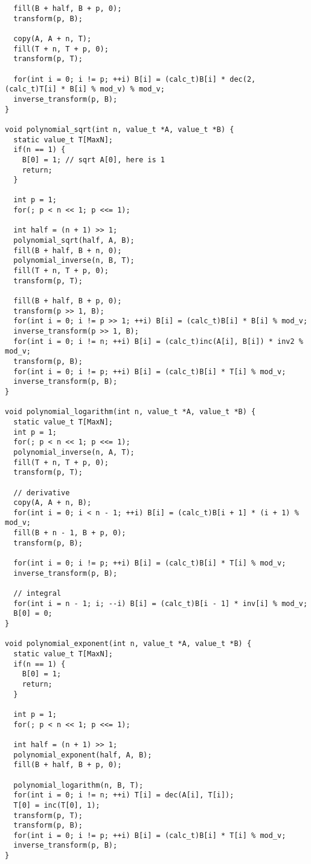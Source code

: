 \begin{verbatim}
  fill(B + half, B + p, 0);
  transform(p, B);

  copy(A, A + n, T);
  fill(T + n, T + p, 0);
  transform(p, T);

  for(int i = 0; i != p; ++i) B[i] = (calc_t)B[i] * dec(2, (calc_t)T[i] * B[i] % mod_v) % mod_v;
  inverse_transform(p, B);
}

void polynomial_sqrt(int n, value_t *A, value_t *B) {
  static value_t T[MaxN];
  if(n == 1) {
    B[0] = 1; // sqrt A[0], here is 1
    return;
  }

  int p = 1;
  for(; p < n << 1; p <<= 1);

  int half = (n + 1) >> 1;
  polynomial_sqrt(half, A, B);
  fill(B + half, B + n, 0);
  polynomial_inverse(n, B, T);
  fill(T + n, T + p, 0);
  transform(p, T);

  fill(B + half, B + p, 0);
  transform(p >> 1, B);
  for(int i = 0; i != p >> 1; ++i) B[i] = (calc_t)B[i] * B[i] % mod_v;
  inverse_transform(p >> 1, B);
  for(int i = 0; i != n; ++i) B[i] = (calc_t)inc(A[i], B[i]) * inv2 % mod_v;
  transform(p, B);
  for(int i = 0; i != p; ++i) B[i] = (calc_t)B[i] * T[i] % mod_v;
  inverse_transform(p, B);
}

void polynomial_logarithm(int n, value_t *A, value_t *B) {
  static value_t T[MaxN];
  int p = 1;
  for(; p < n << 1; p <<= 1);
  polynomial_inverse(n, A, T);
  fill(T + n, T + p, 0);
  transform(p, T);

  // derivative
  copy(A, A + n, B);
  for(int i = 0; i < n - 1; ++i) B[i] = (calc_t)B[i + 1] * (i + 1) % mod_v;
  fill(B + n - 1, B + p, 0);
  transform(p, B);

  for(int i = 0; i != p; ++i) B[i] = (calc_t)B[i] * T[i] % mod_v;
  inverse_transform(p, B);

  // integral
  for(int i = n - 1; i; --i) B[i] = (calc_t)B[i - 1] * inv[i] % mod_v;
  B[0] = 0;
}

void polynomial_exponent(int n, value_t *A, value_t *B) {
  static value_t T[MaxN];
  if(n == 1) {
    B[0] = 1;
    return;
  }

  int p = 1; 
  for(; p < n << 1; p <<= 1);

  int half = (n + 1) >> 1;
  polynomial_exponent(half, A, B);
  fill(B + half, B + p, 0);

  polynomial_logarithm(n, B, T);
  for(int i = 0; i != n; ++i) T[i] = dec(A[i], T[i]);
  T[0] = inc(T[0], 1);
  transform(p, T);
  transform(p, B);
  for(int i = 0; i != p; ++i) B[i] = (calc_t)B[i] * T[i] % mod_v;
  inverse_transform(p, B);
}


\end{verbatim}
